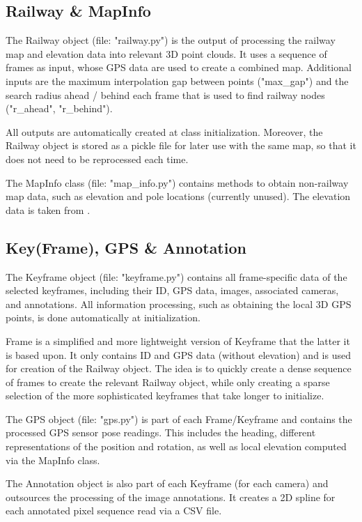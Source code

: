 \subsection*{Railway \& MapInfo}

The Railway object (file: "railway.py") is the output of processing the railway map and elevation data into relevant 3D point clouds. It uses a sequence of frames as input, whose GPS data are used to create a combined map. Additional inputs are the maximum interpolation gap between points ("max\_gap") and the search radius ahead / behind each frame that is used to find railway nodes ("r\_ahead", "r\_behind").

All outputs are automatically created at class initialization. Moreover, the Railway object is stored as a pickle file for later use with the same map, so that it does not need to be reprocessed each time.

The MapInfo class (file: "map\_info.py") contains methods to obtain non-railway map data, such as elevation and pole locations (currently unused). The elevation data is taken from \cite{geobasisbb2023dgm}.


\subsection*{Key(Frame), GPS \& Annotation}

The Keyframe object (file: "keyframe.py") contains all frame-specific data of the selected keyframes, including their ID, GPS data, images, associated cameras, and annotations. All information processing, such as obtaining the local 3D GPS points, is done automatically at initialization.

Frame is a simplified and more lightweight version of Keyframe that the latter it is based upon. It only contains ID and GPS data (without elevation) and is used for creation of the Railway object. The idea is to quickly create a dense sequence of frames to create the relevant Railway object, while only creating a sparse selection of the more sophisticated keyframes that take longer to initialize.

The GPS object (file: "gps.py") is part of each Frame/Keyframe and contains the processed GPS sensor pose readings. This includes the heading, different representations of the position and rotation, as well as local elevation computed via the MapInfo class.

The Annotation object is also part of each Keyframe (for each camera) and outsources the processing of the image annotations. It creates a 2D spline for each annotated pixel sequence read via a CSV file.

